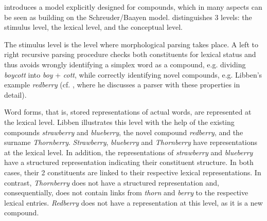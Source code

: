 
 



\citet{Libben:1998} introduces a model explicitly designed for
compounds, which in many aspects can be seen as building on the Schreuder/Baayen model. 
\citet{Libben:1998}
distinguishes 3 levels: the stimulus level, the lexical
level, and the conceptual level.

The stimulus level is the level where morphological parsing takes
place. A left to right recursive parsing
  procedure checks both constituents for lexical status and thus
  avoids wrongly identifying a simplex word as a
  compound, e.g. dividing \emph{boycott} into \emph{boy} + \emph{cott}, while correctly identifying novel compounds, e.g. Libben's example
  \emph{redberry} (cf. \citealt{Libben:1994}, where he discusses a parser with these properties in detail).


Word forms, that is, stored representations of actual words, are represented at the lexical level. Libben illustrates
this level with the help of the existing
compounds \emph{strawberry} and \emph{blueberry}, the novel compound
\emph{redberry}, and the surname \emph{Thornberry}. \emph{Strawberry},
\emph{blueberry} and \emph{Thornberry} have representations at the
lexical level. In addition, the representations of
\emph{strawberry} and \emph{blueberry} have a structured
representation indicating their constituent
structure. In both cases, their 2 constituents are linked to
their respective lexical representations. In contrast, \emph{Thornberry} does
not have a structured representation and, consequentially, does not
contain links from \emph{thorn} and \emph{berry} to the respective
lexical entries. \emph{Redberry} does not have a representation at this level, as it is a new compound. 

